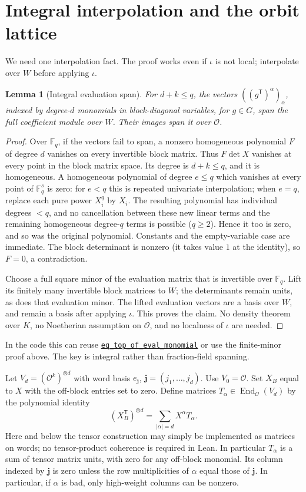 \documentclass[11pt]{article}
\newtheorem{lemma}[theorem]{Lemma}
\newcommand{\OO}{\mathcal O}
\newcommand{\anchor}[3]{\href{https://github.com/VladimirReshetnikov/ProveIt/blob/17bf37ab3b6740d5d7430065d2f2a1a2a03e8a0e/Analysis/GeneralizedRiemannHypothesis/Lean/grh/src/#1.lean\#L#2}{\texttt{#3}}}
\begin{document}
\section{Integral interpolation and the orbit lattice}
We need one interpolation fact. The proof works even if $\iota$ is not local; interpolate over $W$ before applying $\iota$.
\begin{lemma}[Integral evaluation span]\label{lem:density}
For $d+k\le q$, the vectors $( (g^{\mathsf T})^\alpha )_\alpha$, indexed by degree-$d$ monomials in block-diagonal variables, for $g\in G$, span the full coefficient module over $W$. Their images span it over $\OO$.
\end{lemma}
\begin{proof}
Over $\mathbb F_q$, if the vectors fail to span, a nonzero homogeneous polynomial $F$ of degree $d$ vanishes on every invertible block matrix. Thus $F\det X$ vanishes at every point in the block matrix space. Its degree is $d+k\le q$, and it is homogeneous. A homogeneous polynomial of degree $e\le q$ which vanishes at every point of $\mathbb F_q^s$ is zero: for $e<q$ this is repeated univariate interpolation; when $e=q$, replace each pure power $X_i^q$ by $X_i$. The resulting polynomial has individual degrees $<q$, and no cancellation between these new linear terms and the remaining homogeneous degree-$q$ terms is possible ($q\ge2$). Hence it too is zero, and so was the original polynomial. Constants and the empty-variable case are immediate. The block determinant is nonzero (it takes value $1$ at the identity), so $F=0$, a contradiction.

Choose a full square minor of the evaluation matrix that is invertible over $\mathbb F_q$. Lift its finitely many invertible block matrices to $W$; the determinants remain units, as does that evaluation minor. The lifted evaluation vectors are a basis over $W$, and remain a basis after applying $\iota$. This proves the claim. No density theorem over $K$, no Noetherian assumption on $\OO$, and no localness of $\iota$ are needed.
\end{proof}
In the code this can reuse \anchor{New/UpperBound/ElementaryDivisors/InvariantAverage}{301}{eq\_top\_of\_eval\_monomial} or use the finite-minor proof above. The key is integral rather than fraction-field spanning.

Let $V_d=(\OO^k)^{\otimes d}$ with word basis $e_{\mathbf j}$, $\mathbf j=(j_1,\ldots,j_d)$. Use $V_0=\OO$. Set $X_B$ equal to $X$ with the off-block entries set to zero. Define matrices $T_\alpha\in\operatorname{End}_{\OO}(V_d)$ by the polynomial identity
\begin{equation}\label{eq:generic}
 (X_B^{\mathsf T})^{\otimes d}=\sum_{|\alpha|=d}X^\alpha T_\alpha.
\end{equation}
Here and below the tensor construction may simply be implemented as matrices on words; no tensor-product coherence is required in Lean. In particular $T_\alpha$ is a sum of tensor matrix units, with zero for any off-block monomial. Its column indexed by $\mathbf j$ is zero unless the row multiplicities of $\alpha$ equal those of $\mathbf j$. In particular, if $\alpha$ is bad, only high-weight columns can be nonzero.
\end{document}
